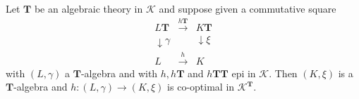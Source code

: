 Let $\mathbf{T}$ be an algebraic theory in $\mathcal{K}$ and suppose given a commutative square
\[
\begin{array}{ccc}
L\mathbf{T} & \xrightarrow{h\mathbf{T}} & K\mathbf{T} \\
\downarrow{\gamma} & & \downarrow{\xi} \\
L & \xrightarrow{h} & K
\end{array}
\]
with $(L, \gamma)$ a $\mathbf{T}$-algebra and with $h, h\mathbf{T}$ and $h\mathbf{T}\mathbf{T}$ epi in $\mathcal{K}$. Then $(K, \xi)$ is a $\mathbf{T}$-algebra and $h: (L, \gamma) \longrightarrow (K, \xi)$ is co-optimal in $\mathcal{K}^{\mathbf{T}}$.
